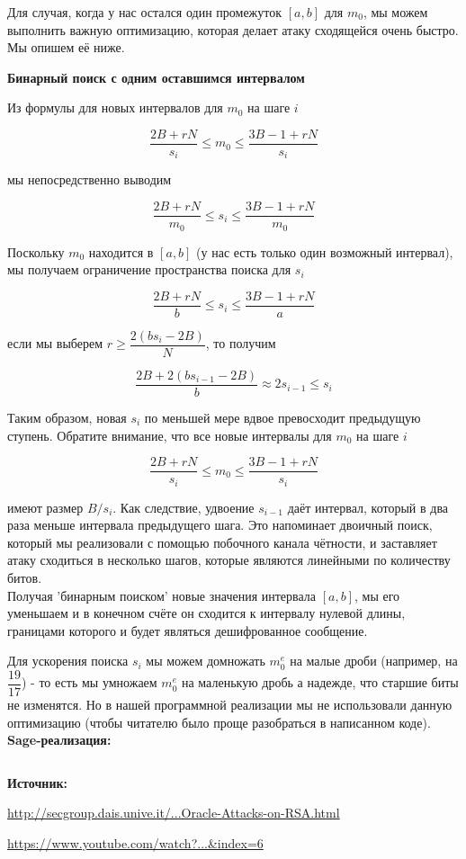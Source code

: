 \documentclass[12pt,a4paper]{scrartcl}
\begin{document}
Для случая, когда у нас остался один промежуток $[a, b]$ для $m_0$, мы можем выполнить важную оптимизацию, которая делает атаку сходящейся очень быстро. Мы опишем её ниже.


\textbf{Бинарный поиск с одним оставшимся интервалом}

Из формулы для новых интервалов для $m_0$ на шаге $i$ 

$$\dfrac{2B+rN}{s_i} \leq m_0 \leq \dfrac{3B-1+rN}{s_i}$$

мы непосредственно выводим

$$\dfrac{2B+rN}{m_0} \leq s_i \leq \dfrac{3B-1+rN}{m_0}$$

Поскольку $m_0$ находится в $[a, b]$ (у нас есть только один возможный интервал), мы получаем ограничение пространства поиска для $s_i$

$$\dfrac{2B+rN}{b} \leq s_i \leq \dfrac{3B-1+rN}{a}$$

если мы выберем $r \geq \dfrac{2(bs_i-2B)}{N}$, то получим

$$\dfrac{2B+2(bs_{i-1} - 2B)}{b} \approx 2s_{i-1} \leq s_i$$

Таким образом, новая $s_i$ по меньшей мере вдвое превосходит предыдущую ступень. Обратите внимание, что все новые интервалы для $m_0$ на шаге $i$

$$\dfrac{2B+rN}{s_i} \leq m_0 \leq \dfrac{3B-1+rN}{s_i}$$

имеют размер $B/s_i$. Как следствие, удвоение $s_{i-1}$ даёт интервал, который в два раза меньше интервала предыдущего шага. Это напоминает двоичный поиск, который мы реализовали с помощью побочного канала чётности, и заставляет атаку сходиться в несколько шагов, которые являются линейными по количеству битов.\\

Получая 'бинарным поиском' новые значения интервала $[a, b]$, мы его уменьшаем и в конечном счёте он сходится к интервалу нулевой длины, границами которого и будет являться дешифрованное сообщение.


Для ускорения поиска $s_i$ мы можем домножать $m_0^e$  на малые дроби (например, на $\dfrac{19}{17}$) - то есть мы умножаем $m_0^e$ на маленькую дробь а надежде, что старшие биты не изменятся. Но в нашей программной реализации мы не использовали данную оптимизацию (чтобы читателю было проще разобраться в написанном коде).\\

\textbf{Sage-реализация:}

\inputminted[tabsize=4,obeytabs,fontsize=\footnotesize]{python3}{./RSA_scripts/bleichenbacher.sage}

\textbf{Источник:}

\href{http://secgroup.dais.unive.it/wp-content/uploads/2012/11/Practical-Padding-Oracle-Attacks-on-RSA.html}{http://secgroup.dais.unive.it/...Oracle-Attacks-on-RSA.html}

\href{https://www.youtube.com/watch?v=ibfb7\_-\_CGg\&list=PLLguubeCGWoaGFEDzduGmBhEgZ62p-Jqv\&index=6}{https://www.youtube.com/watch?...\&index=6}\\
\end{document}
